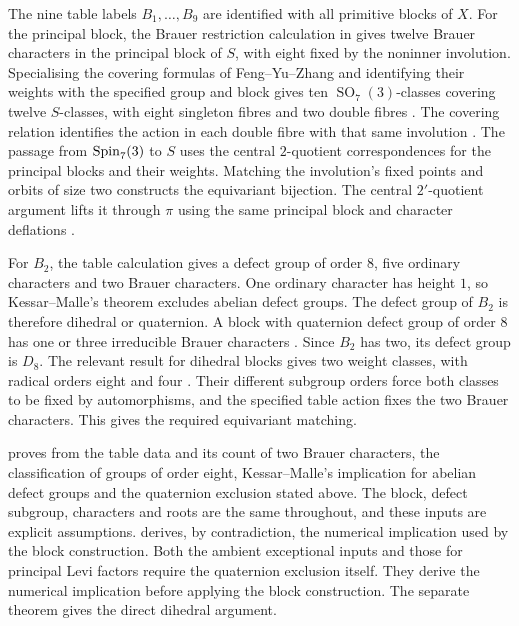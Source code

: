 The nine table labels $B_1,\ldots,B_9$ are identified with all primitive
blocks of $X$.
For the principal block, the Brauer restriction calculation in
 gives twelve Brauer characters in the principal block of $S$, with eight fixed
by the noninner
involution. Specialising the covering formulas of Feng--Yu--Zhang and
identifying their weights with the specified group and block gives ten
$\operatorname{SO}_7(3)$-classes covering twelve $S$-classes,
with eight singleton fibres and two double fibres
\cite[Lemma~5.7 and the proof of Proposition~5.11]{FengYuZhang2024}.
The covering relation identifies the action in each double fibre with
that same involution \cite[Corollary~2.22(2)]{FengYuZhang2024}. The passage from $\operatorname{Spin}_7(3)$ to $S$ uses the central $2$-quotient
correspondences for the principal blocks and their weights. Matching
the involution's fixed points and orbits of size two constructs the
equivariant bijection. The central $2'$-quotient
argument lifts it through $\pi$ using the same principal block and
character deflations \cite[Lemma~2.5]{FengLiZhang2019}.

For $B_2$, the table calculation gives a defect group of order $8$, five ordinary
characters and two Brauer characters. One ordinary character has height
$1$, so Kessar--Malle's theorem \cite[Theorem~1.1]{KessarMalle2013}
excludes abelian defect groups. The defect group of $B_2$ is therefore
dihedral or quaternion. A block with quaternion defect group of order
$8$ has one or three irreducible Brauer characters
\cite[Theorem~8.1]{Sambale2014}. Since $B_2$ has two, its defect group is $D_8$. The relevant result for dihedral blocks gives two weight
classes, with radical orders eight and four
\cite[proof of Theorem~4.1]{Sambale2012}. Their different subgroup
orders force both classes to be fixed by automorphisms, and the
specified table action fixes the two Brauer characters. This gives
the required equivariant matching.

\begin{implementation}
 proves
 from the table data and its count of two
Brauer characters, the classification of groups of order eight,
Kessar--Malle's implication for abelian defect groups and the
quaternion exclusion stated above. The block, defect subgroup, characters and roots
are the same throughout, and these inputs are explicit assumptions.
 derives, by contradiction,
the numerical implication used by the block construction.
Both the ambient exceptional inputs and those for principal Levi factors
require the quaternion exclusion itself. They derive the numerical
implication before applying the block construction. The separate
theorem  gives the direct dihedral argument.
\end{implementation}

